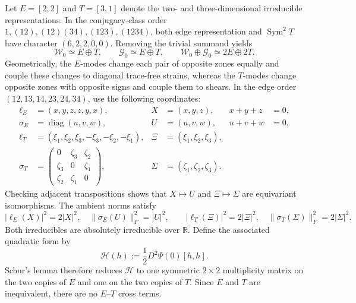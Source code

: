 \documentclass[11pt]{article}
\newcommand{\R}{\mathbb R}
\newcommand{\Sym}{\operatorname{Sym}}
\theoremstyle{remark}
\begin{document}
Let $E=[2,2]$ and $T=[3,1]$ denote the two- and three-dimensional irreducible
representations.  In the conjugacy-class order $1,(12),(12)(34),(123),(1234)$, both 
edge representation and $\Sym^2T$ have character $(6,2,2,0,0)$.  Removing the trivial
summand yields
\begin{equation}\label{eq:decomposition}
 \mathcal W_0\simeq E\oplus T,
 \qquad
 \mathcal G_0\simeq E\oplus T,
 \qquad
 \mathcal W_0\oplus\mathcal G_0\simeq2E\oplus2T.
\end{equation}
Geometrically, the $E$-modes change each pair of opposite zones equally and couple these changes to diagonal trace-free strains, whereas the $T$-modes change opposite zones with opposite signs and couple them to shears.  
In the edge order $(12,13,14,23,24,34)$, use the following coordinates:
\begin{equation}\label{eq:isotypic-coordinates}
\begin{aligned}
 \ell_E&=(x,y,z,z,y,x),& X&=(x,y,z),&x+y+z&=0,\\
 \sigma_E&=\operatorname{diag}(u,v,w),&U&=(u,v,w),&u+v+w&=0,\\
 \ell_T&=(\xi_1,\xi_2,\xi_3,-\xi_3,-\xi_2,-\xi_1),
   &\Xi&=(\xi_1,\xi_2,\xi_3),\\
 \sigma_T&=\begin{pmatrix}0&\zeta_3&\zeta_2\\
                    \zeta_3&0&\zeta_1\\
                    \zeta_2&\zeta_1&0\end{pmatrix},
   &\Sigma&=(\zeta_1,\zeta_2,\zeta_3).
\end{aligned}
\end{equation}
Checking adjacent transpositions shows that $X\mapsto U$ and $\Xi\mapsto\Sigma$ are
equivariant isomorphisms.  The ambient norms satisfy
\[
 |\ell_E(X)|^2=2|X|^2,\quad \|\sigma_E(U)\|_F^2=|U|^2,
 \qquad
 |\ell_T(\Xi)|^2=2|\Xi|^2,\quad
 \|\sigma_T(\Sigma)\|_F^2=2|\Sigma|^2.
\]
Both irreducibles are absolutely irreducible over $\R$.  Define the associated quadratic form by
\[
 \mathcal H(h):=\frac12D^2\Psi(0)[h,h].
\]
Schur's lemma therefore reduces $\mathcal H$ to one symmetric $2\times2$ multiplicity matrix
on the two copies of $E$ and one on the
two copies of $T$.  Since $E$ and $T$ are inequivalent, there are no $E$--$T$ cross terms.
\end{document}
